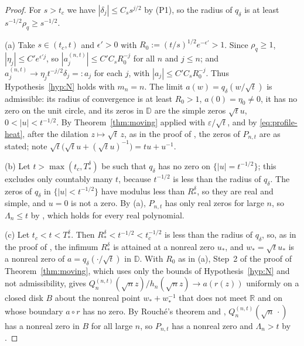 \documentclass[11pt]{amsart}
\theoremstyle{definition}
\theoremstyle{remark}
\numberwithin{equation}{section}
\newcommand{\R}{\mathbb{R}}
\newcommand{\D}{\mathbb{D}}
\newcommand{\eps}{\varepsilon}
\begin{document}
\begin{proof}
For $s>t_c$ we have $|\delta_j|\le C_ss^{j/2}$ by (P1), so the radius of $q_\delta$ is at least $s^{-1/2}\rho_q\ge s^{-1/2}$.

(a) Take $s\in(t_c,t)$ and $\epsilon'>0$ with $R_0:=(t/s)^{1/2}e^{-\epsilon'}>1$. Since $\rho_q\ge1$, $|\eta_j|\le C'e^{\epsilon'j}$, so $|a^{(n,t)}_j|\le C'C_sR_0^{-j}$ for all $n$ and $j\le n$; and $a^{(n,t)}_j\to\eta_jt^{-j/2}\delta_j=:a_j$ for each $j$, with $|a_j|\le C'C_sR_0^{-j}$. Thus Hypothesis~\ref{hyp:N} holds with $m_n=n$. The limit $a(w)=q_\delta(w/\sqrt t)$ is admissible: its radius of convergence is at least $R_0>1$, $a(0)=\eta_0\ne0$, it has no zero on the unit circle, and its zeros in $\D$ are the simple zeros $\sqrt tu$, $0<|u|<t^{-1/2}$. By Theorem~\ref{thm:moving} applied with $\eps/\sqrt t$, and by \eqref{eq:profile-heat}, after the dilation $z\mapsto\sqrt t\,z$, as in the proof of \cite[Theorem~\ref{M-thm:fixedq}(a)]{Main}, the zeros of $P_{n,t}$ are as stated; note $\sqrt t\bigl(\sqrt tu+(\sqrt tu)^{-1}\bigr)=tu+u^{-1}$.

(b) Let $t>\max(t_c,T^\delta_*)$ be such that $q_\delta$ has no zero on $\{|u|=t^{-1/2}\}$; this excludes only countably many $t$, because $t^{-1/2}$ is less than the radius of $q_\delta$. The zeros of $q_\delta$ in $\{|u|<t^{-1/2}\}$ have modulus less than $R^\delta_*$, so they are real and simple, and $u=0$ is not a zero. By (a), $P_{n,t}$ has only real zeros for large $n$, so $\Lambda_n\le t$ by \cite[Lemma~\ref{M-lem:heat}(c)]{Main}, which holds for every real polynomial.

(c) Let $t_c<t<T^\delta_*$. Then $R^\delta_*<t^{-1/2}<t_c^{-1/2}$ is less than the radius of $q_\delta$, so, as in the proof of \cite[Theorem~\ref{M-thm:fixedq}(c)]{Main}, the infimum $R^\delta_*$ is attained at a nonreal zero $u_*$, and $w_*=\sqrt tu_*$ is a nonreal zero of $a=q_\delta(\cdot/\sqrt t)$ in $\D$. With $R_0$ as in (a), Step~2 of the proof of Theorem~\ref{thm:moving}, which uses only the bounds of Hypothesis~\ref{hyp:N} and not admissibility, gives $Q^{(n,t)}_n(\sqrt nz)/h_n(\sqrt nz)\to a(r(z))$ uniformly on a closed disk $B$ about the nonreal point $w_*+w_*^{-1}$ that does not meet $\R$ and on whose boundary $a\circ r$ has no zero. By Rouch\'e's theorem and \cite[Lemma~\ref{M-lem:resolvent}]{Main}, $Q^{(n,t)}_n(\sqrt n\,\cdot)$ has a nonreal zero in $B$ for all large $n$, so $P_{n,t}$ has a nonreal zero and $\Lambda_n>t$ by \cite[Lemma~\ref{M-lem:heat}(c)]{Main}.
\end{proof}
\end{document}
